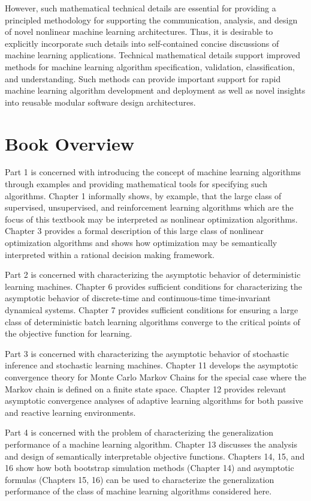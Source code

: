 However, such mathematical
technical details are essential for providing a principled methodology for supporting the communication,
analysis, and design of novel nonlinear machine learning architectures. Thus, it is desirable to 
explicitly incorporate such details into self-contained concise discussions of machine learning applications.
Technical mathematical
details support improved methods for machine learning algorithm specification, validation, classification,
and understanding. Such methods can provide important support for rapid machine learning algorithm development
and deployment as well as novel insights into reusable modular software design architectures. 

\section*{Book Overview}
Part 1 is concerned with introducing the concept of machine learning algorithms through examples and
providing mathematical tools for specifying such algorithms.
Chapter 1 informally shows, by example, that the large class of supervised, unsupervised, and 
reinforcement learning algorithms
which are the focus of this textbook
may be interpreted as nonlinear optimization algorithms. 
Chapter 3 provides a formal description of this large class of nonlinear optimization algorithms and
shows how optimization may be semantically interpreted within a rational decision making framework.

Part 2 is concerned with characterizing the asymptotic behavior of deterministic learning machines.
Chapter 6 provides sufficient conditions  for characterizing the
asymptotic behavior of discrete-time and continuous-time time-invariant dynamical systems.
Chapter 7 provides sufficient conditions for ensuring a large class of deterministic batch learning algorithms
converge to the critical points of the objective function for learning.

Part 3 is concerned with characterizing the asymptotic behavior of stochastic inference and stochastic learning machines.
Chapter 11 develops the asymptotic convergence theory for Monte Carlo Markov Chains for the special case where
the Markov chain is defined on a finite state space. Chapter 12 provides relevant asymptotic
convergence analyses of adaptive learning algorithms for both
passive and reactive learning environments.

Part 4 is concerned with the problem of characterizing the generalization performance of a machine learning algorithm.
Chapter 13 discusses the analysis and design of semantically interpretable objective functions.
Chapters 14, 15, and 16 show how both bootstrap simulation methods (Chapter 14) and asymptotic formulas
(Chapters 15, 16) can be used to characterize
the generalization performance of the class of machine learning algorithms considered here.  

